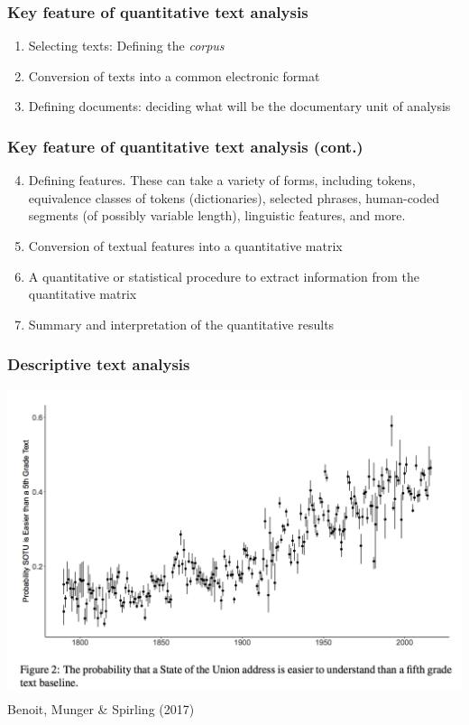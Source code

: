 \documentclass[notes=hide]{beamer}
\begin{document}
\begin{frame}
	\frametitle{Key feature of quantitative text analysis}
	\begin{enumerate}[<+->]
		\setlength{\itemsep}{1.5ex}
		\item \alert{Selecting texts}: Defining the \emph{corpus}
		\item \alert{Conversion} of texts into a common electronic format
		\item \alert{Defining documents}: deciding what will be the
		documentary unit of analysis
	\end{enumerate}
\end{frame}

\begin{frame}
	\frametitle{Key feature of quantitative text analysis (cont.)}
	\begin{enumerate}[<+->]
		\setcounter{enumi}{3}
		\setlength{\itemsep}{1.5ex}
		\item \alert{Defining features}.  These can take a variety of forms,
		including tokens, equivalence classes of tokens (dictionaries),
		selected phrases, human-coded segments (of possibly variable
		length), linguistic features, and more.
		\item \alert{Conversion of textual features into a quantitative
			matrix}
		\item A \alert{quantitative or statistical procedure} to extract information
		from the quantitative matrix
		\item \alert{Summary} and interpretation of the quantitative results
	\end{enumerate}
\end{frame}


\begin{frame}
	\frametitle{Descriptive text analysis}
	
	\includegraphics[width=1\textwidth]{figures/readability.png}\\
	\centering Benoit, Munger \& Spirling (2017)
	
	
\end{frame}
\end{document}
